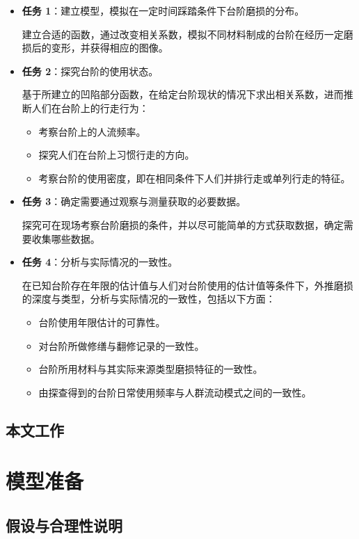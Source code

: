 \documentclass[11pt,a4paper,fontset=windows]{ctexart}
\begin{document}
\begin{itemize}
\item \textbf{任务 1}：建立模型，模拟在一定时间踩踏条件下台阶磨损的分布。

建立合适的函数，通过改变相关系数，模拟不同材料制成的台阶在经历一定磨损后的变形，并获得相应的图像。

\item \textbf{任务 2}：探究台阶的使用状态。

基于所建立的凹陷部分函数，在给定台阶现状的情况下求出相关系数，进而推断人们在台阶上的行走行为：
\begin{itemize}
\item 考察台阶上的人流频率。
\item 探究人们在台阶上习惯行走的方向。
\item 考察台阶的使用密度，即在相同条件下人们并排行走或单列行走的特征。
\end{itemize}

\item \textbf{任务 3}：确定需要通过观察与测量获取的必要数据。

探究可在现场考察台阶磨损的条件，并以尽可能简单的方式获取数据，确定需要收集哪些数据。

\item \textbf{任务 4}：分析与实际情况的一致性。

在已知台阶存在年限的估计值与人们对台阶使用的估计值等条件下，外推磨损的深度与类型，分析与实际情况的一致性，包括以下方面：
\begin{itemize}
\item 台阶使用年限估计的可靠性。
\item 对台阶所做修缮与翻修记录的一致性。
\item 台阶所用材料与其实际来源类型磨损特征的一致性。
\item 由探查得到的台阶日常使用频率与人群流动模式之间的一致性。
\end{itemize}
\end{itemize}

\subsection{本文工作}

\newpage

\section{模型准备}

\subsection{假设与合理性说明}
\end{document}

